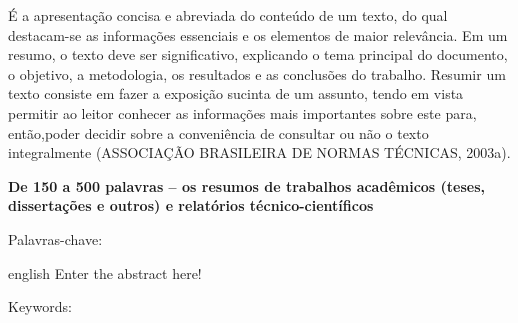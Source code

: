 \begin{resumo}
  \vspace{-15pt}
  
  É a apresentação concisa e abreviada do conteúdo de um texto, do qual destacam-se as informações essenciais e os elementos de maior relevância. Em um resumo, o texto deve ser significativo, explicando o tema principal do documento, o objetivo, a metodologia, os resultados e as conclusões do trabalho. Resumir um texto consiste em fazer a exposição sucinta de um assunto, tendo em vista permitir ao leitor conhecer as informações mais importantes sobre este para, então,poder decidir sobre a conveniência de consultar ou não o texto integralmente (ASSOCIAÇÃO BRASILEIRA DE NORMAS TÉCNICAS, 2003a).

  \textbf{De 150 a 500 palavras – os resumos de trabalhos acadêmicos (teses, dissertações e outros) e relatórios técnico-científicos}

  Palavras-chave: \palavraschaveemlinha
\end{resumo}

\begin{resumo}[Abstract]
  \vspace{-15pt}
  
  \begin{otherlanguage*}{english}
  Enter the abstract here!
  
  Keywords: \inlinekeywords
\end{otherlanguage*}
\end{resumo}